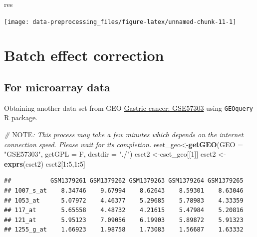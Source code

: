 \documentclass[
  12pt,
]{book}
\newenvironment{Shaded}{\begin{snugshade}}{\end{snugshade}}
\newcommand{\AlertTok}[1]{\textcolor[rgb]{0.94,0.16,0.16}{#1}}
\newcommand{\AttributeTok}[1]{\textcolor[rgb]{0.13,0.29,0.53}{#1}}
\newcommand{\CommentTok}[1]{\textcolor[rgb]{0.56,0.35,0.01}{\textit{#1}}}
\newcommand{\DecValTok}[1]{\textcolor[rgb]{0.00,0.00,0.81}{#1}}
\newcommand{\FunctionTok}[1]{\textcolor[rgb]{0.13,0.29,0.53}{\textbf{#1}}}
\newcommand{\NormalTok}[1]{#1}
\newcommand{\OtherTok}[1]{\textcolor[rgb]{0.56,0.35,0.01}{#1}}
\newcommand{\SpecialCharTok}[1]{\textcolor[rgb]{0.81,0.36,0.00}{\textbf{#1}}}
\newcommand{\StringTok}[1]{\textcolor[rgb]{0.31,0.60,0.02}{#1}}
\begin{document}
\begin{Shaded}
\begin{Highlighting}[]
\NormalTok{res}
\end{Highlighting}
\end{Shaded}

\begin{center}\texttt{[image: data-preprocessing\_files/figure-latex/unnamed-chunk-11-1]} \end{center}

\hypertarget{batch-effect-correction}{%
\section{Batch effect correction}\label{batch-effect-correction}}

\hypertarget{for-microarray-data}{%
\subsection{For microarray data}\label{for-microarray-data}}

Obtaining another data set from GEO \href{https://www.ncbi.nlm.nih.gov/pubmed/24935174/}{Gastric cancer: GSE57303} using \texttt{GEOquery} R package.

\begin{Shaded}
\begin{Highlighting}[]
\CommentTok{\# }\AlertTok{NOTE}\CommentTok{: This process may take a few minutes which depends on the internet connection speed. Please wait for its completion.}
\NormalTok{eset\_geo}\OtherTok{\textless{}{-}}\FunctionTok{getGEO}\NormalTok{(}\AttributeTok{GEO     =} \StringTok{"GSE57303"}\NormalTok{, }\AttributeTok{getGPL  =}\NormalTok{ F, }\AttributeTok{destdir =} \StringTok{"./"}\NormalTok{)}
\NormalTok{eset2    }\OtherTok{\textless{}{-}}\NormalTok{eset\_geo[[}\DecValTok{1}\NormalTok{]]}
\NormalTok{eset2    }\OtherTok{\textless{}{-}}\FunctionTok{exprs}\NormalTok{(eset2)}
\NormalTok{eset2[}\DecValTok{1}\SpecialCharTok{:}\DecValTok{5}\NormalTok{,}\DecValTok{1}\SpecialCharTok{:}\DecValTok{5}\NormalTok{]}
\end{Highlighting}
\end{Shaded}

\begin{verbatim}
##           GSM1379261 GSM1379262 GSM1379263 GSM1379264 GSM1379265
## 1007_s_at    8.34746    9.67994    8.62643    8.59301    8.63046
## 1053_at      5.07972    4.46377    5.29685    5.78983    4.33359
## 117_at       5.65558    4.48732    4.21615    5.47984    5.20816
## 121_at       5.95123    7.09056    6.19903    5.89872    5.91323
## 1255_g_at    1.66923    1.98758    1.73083    1.56687    1.63332
\end{verbatim}
\end{document}
